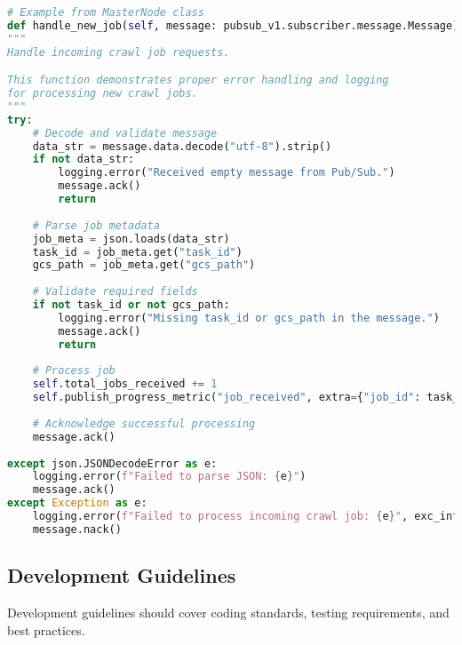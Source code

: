 \documentclass[12pt,a4paper]{report}
\begin{document}
\begin{lstlisting}[language=Python]
# Example from MasterNode class
def handle_new_job(self, message: pubsub_v1.subscriber.message.Message):
"""
Handle incoming crawl job requests.

This function demonstrates proper error handling and logging
for processing new crawl jobs.
"""
try:
    # Decode and validate message
    data_str = message.data.decode("utf-8").strip()
    if not data_str:
        logging.error("Received empty message from Pub/Sub.")
        message.ack()
        return
        
    # Parse job metadata
    job_meta = json.loads(data_str)
    task_id = job_meta.get("task_id")
    gcs_path = job_meta.get("gcs_path")
    
    # Validate required fields
    if not task_id or not gcs_path:
        logging.error("Missing task_id or gcs_path in the message.")
        message.ack()
        return
        
    # Process job
    self.total_jobs_received += 1
    self.publish_progress_metric("job_received", extra={"job_id": task_id})
    
    # Acknowledge successful processing
    message.ack()
    
except json.JSONDecodeError as e:
    logging.error(f"Failed to parse JSON: {e}")
    message.ack()
except Exception as e:
    logging.error(f"Failed to process incoming crawl job: {e}", exc_info=True)
    message.nack()
\end{lstlisting}

\subsection{Development Guidelines}
Development guidelines should cover coding standards, testing requirements, and best practices.
\end{document}

